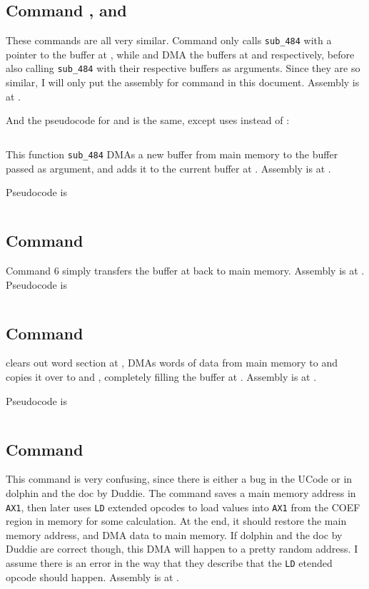 \inputminted{cpp}{../ucode/command_3.c}

\subsection{Command ,  and }
These commands are all very similar. Command  only calls \texttt{sub_484} with a pointer to the buffer at , while  and  DMA the buffers at  and  respectively, before also calling \texttt{sub_484} with their respective buffers as arguments. Since they are so similar, I will only put the assembly for command  in this document. Assembly is at .

And the pseudocode for  and  is the same, except  uses  instead of :

\inputminted{c}{../ucode/command_459.c}

This function \texttt{sub_484} DMAs a new buffer from main memory to the buffer passed as argument, and adds it to the current buffer at . Assembly is at .

Pseudocode is

\inputminted{c}{../ucode/mix_buffers.c}

\subsection{Command }
Command 6 simply transfers the buffer at  back to main memory. Assembly is at .
Pseudocode is

\inputminted{c}{../ucode/command_6.c}

\subsection{Command }
clears out  word section at , DMAs  words of data from main memory to  and copies it over to  and , completely filling the buffer at . Assembly is at .

Pseudocode is

\inputminted{c}{../ucode/command_7.c}

\subsection{Command }
This command is very confusing, since there is either a bug in the UCode or in dolphin and the doc by Duddie. The command saves a main memory address in \texttt{AX1}, then later uses \texttt{LD} extended opcodes to load values into \texttt{AX1} from the COEF region in memory for some calculation. At the end, it should restore the main memory address, and DMA data to main memory. If dolphin and the doc by Duddie are correct though, this DMA will happen to a pretty random address. I assume there is an error in the way that they describe that the \texttt{LD} etended opcode should happen. Assembly is at .

